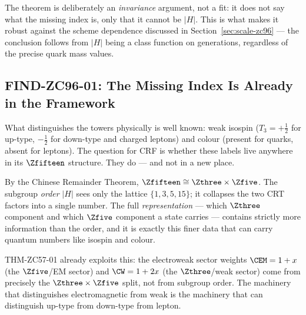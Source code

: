 \documentclass[12pt, a4paper]{article}
\begin{document}
The theorem is deliberately an \emph{invariance} argument, not a fit: it does
not say what the missing index is, only that it cannot be $|H|$. This is what
makes it robust against the scheme dependence discussed in
Section~\ref{sec:scale-zc96} --- the conclusion follows from $|H|$ being a class
function on generations, regardless of the precise quark mass values.


\subsection{FIND-ZC96-01: The Missing Index Is Already in the Framework}
\label{sec:gift-zc96}

What distinguishes the towers physically is well known: weak isospin
($T_3=+\tfrac12$ for up-type, $-\tfrac12$ for down-type and charged leptons) and
colour (present for quarks, absent for leptons). The question for CRF is whether
these labels live anywhere in its $\Zfifteen$ structure. They do --- and not in
a new place.

\begin{genealogybox}[title={Where the tower index lives: $\Zfifteen=\Zthree
  \times\Zfive$}]
By the Chinese Remainder Theorem, $\Zfifteen\cong\Zthree\times\Zfive$. The
subgroup \emph{order} $|H|$ sees only the lattice $\{1,3,5,15\}$; it collapses
the two CRT factors into a single number. The full \emph{representation} ---
which $\Zthree$ component and which $\Zfive$ component a state carries ---
contains strictly more information than the order, and it is exactly this finer
data that can carry quantum numbers like isospin and colour.

THM-ZC57-01 already exploits this: the electroweak sector weights
$\CEM=1+x$ (the $\Zfive$/EM sector) and $\CW=1+2x$ (the $\Zthree$/weak sector)
come from precisely the $\Zthree\times\Zfive$ split, not from subgroup order.
The machinery that distinguishes electromagnetic from weak is the machinery that
can distinguish up-type from down-type from lepton.
\end{genealogybox}
\end{document}
